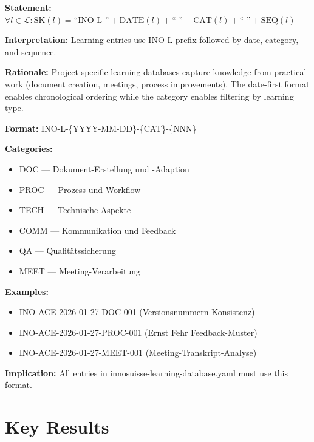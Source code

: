 \begin{tcolorbox}[colback=gray!5!white, colframe=gray!75!black,
    title=Axiom UNMAPPED_SK-10: Learning Database Keys]
\textbf{Statement:} $\forall l \in \mathcal{L}: \text{SK}(l) = \text{``INO-L-''} + \text{DATE}(l) + \text{``-''} + \text{CAT}(l) + \text{``-''} + \text{SEQ}(l)$

\textbf{Interpretation:} Learning entries use INO-L prefix followed by date, category, and sequence.

\textbf{Rationale:} Project-specific learning databases capture knowledge from practical work
(document creation, meetings, process improvements). The date-first format enables chronological
ordering while the category enables filtering by learning type.

\textbf{Format:} INO-L-\{YYYY-MM-DD\}-\{CAT\}-\{NNN\}

\textbf{Categories:}
\begin{itemize}[nosep]
\item DOC --- Dokument-Erstellung und -Adaption
\item PROC --- Prozess und Workflow
\item TECH --- Technische Aspekte
\item COMM --- Kommunikation und Feedback
\item QA --- Qualitätssicherung
\item MEET --- Meeting-Verarbeitung
\end{itemize}

\textbf{Examples:}
\begin{itemize}[nosep]
\item INO-ACE-2026-01-27-DOC-001 (Versionsnummern-Konsistenz)
\item INO-ACE-2026-01-27-PROC-001 (Ernst Fehr Feedback-Muster)
\item INO-ACE-2026-01-27-MEET-001 (Meeting-Transkript-Analyse)
\end{itemize}

\textbf{Implication:} All entries in innosuisse-learning-database.yaml must use this format.
\end{tcolorbox}


\section{Key Results}
\label{sec:superkey-results}

